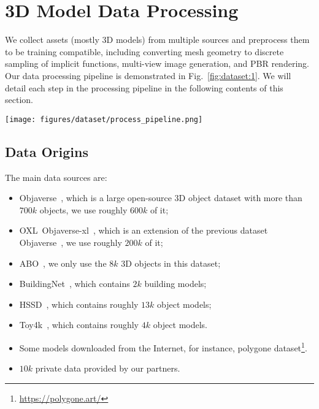 


\section{3D Model Data Processing} %
\label{sec:datasets}
We collect assets (mostly 3D models) from multiple sources and preprocess them to be training compatible, including converting mesh geometry to discrete sampling of implicit functions, multi-view image generation, and PBR rendering.
Our data processing pipeline is demonstrated in Fig.~\ref{fig:dataset:1}.
We will detail each step in the processing pipeline in the following contents of this section.

\begin{figure*}
    \centering 

    \texttt{[image: figures/dataset/process\_pipeline.png]}
    \caption[Data processing pipline.]
    {Data processing pipline. The procedures marked in red are one-off implementations, while the green-boxed elements demand tailored development according to the algorithmic modules deployed on the dataset, we thereby provide exampled steps for jobs described in Section~\ref{sec:3dshape} and Section~\ref{sec:texture:multiview}.}
    \label{fig:dataset:1}
\end{figure*}

\subsection{Data Origins}
\label{sec:datasets:origin}

The main data sources are:
\begin{itemize}
    \item Objaverse~\cite{deitke2023objaverse}, which is a large open-source 3D object dataset with more than $700k$ objects, we use roughly $600k$ of it;
    \item OXL~\ie Objaverse-xl~\cite{deitke2024objaverse}, which is an extension of the previous dataset Objaverse~\cite{deitke2023objaverse}, we use roughly $200k$ of it;
    \item ABO~\cite{collins2022abo}, we only use the $8k$ 3D objects in this dataset;
    \item BuildingNet~\cite{selvaraju2021buildingnet}, which contains $2k$ building models;
    \item HSSD~\cite{khanna2023hssd}, which contains roughly $13k$ object models;
    \item Toy4k~\cite{stojanov2021using}, which contains roughly $4k$ object models.
    \item Some models downloaded from the Internet, for instance, polygone dataset\footnote{\url{https://polygone.art/}}.
    \item $10k$ private data provided by our partners.
\end{itemize}


